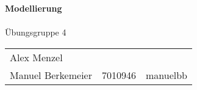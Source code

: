 \begin{titlepage}
\begin{center}
    \vspace*{2cm}
    \Huge\textsf\textbf{Modellierung}\\[2cm]
    \Large\textsf\thetitle\\[1cm]
    \large\textsf{Übungsgruppe 4}\\[4cm]
    \begin{tabular}{lll}
         Alex Menzel & &   \\
         Manuel Berkemeier & 7010946 & manuelbb 
    \end{tabular}
\end{center}
\end{titlepage}